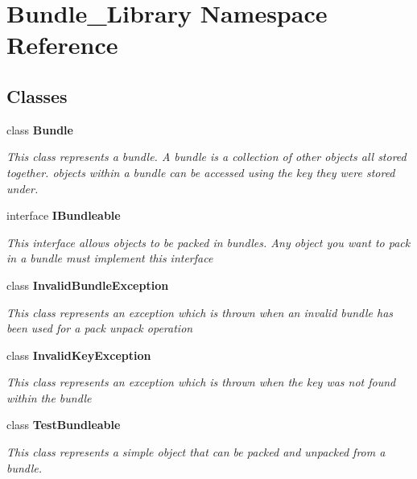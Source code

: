 \section{Bundle\+\_\+\+Library Namespace Reference}
\label{namespace_bundle___library}
\subsection*{Classes}
\begin{DoxyCompactItemize}
\item 
class {\bf Bundle}
\begin{DoxyCompactList}\small\item\em This class represents a bundle. A bundle is a collection of other objects all stored together. objects within a bundle can be accessed using the key they were stored under. \end{DoxyCompactList}\item 
interface {\bf I\+Bundleable}
\begin{DoxyCompactList}\small\item\em This interface allows objects to be packed in bundles. Any object you want to pack in a bundle must implement this interface \end{DoxyCompactList}\item 
class {\bf Invalid\+Bundle\+Exception}
\begin{DoxyCompactList}\small\item\em This class represents an exception which is thrown when an invalid bundle has been used for a pack unpack operation \end{DoxyCompactList}\item 
class {\bf Invalid\+Key\+Exception}
\begin{DoxyCompactList}\small\item\em This class represents an exception which is thrown when the key was not found within the bundle \end{DoxyCompactList}\item 
class {\bf Test\+Bundleable}
\begin{DoxyCompactList}\small\item\em This class represents a simple object that can be packed and unpacked from a bundle. \end{DoxyCompactList}\end{DoxyCompactItemize}
